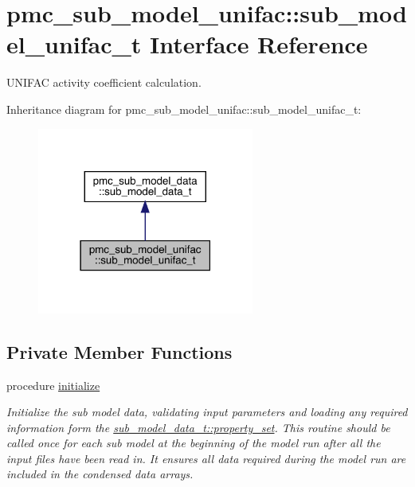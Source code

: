 \hypertarget{structpmc__sub__model__unifac_1_1sub__model__unifac__t}{}\section{pmc\+\_\+sub\+\_\+model\+\_\+unifac\+:\+:sub\+\_\+model\+\_\+unifac\+\_\+t Interface Reference}
\label{structpmc__sub__model__unifac_1_1sub__model__unifac__t}


U\+N\+I\+F\+AC activity coefficient calculation.  




Inheritance diagram for pmc\+\_\+sub\+\_\+model\+\_\+unifac\+:\+:sub\+\_\+model\+\_\+unifac\+\_\+t\+:\nopagebreak
\begin{figure}[H]
\begin{center}
\leavevmode
\includegraphics[width=202pt]{structpmc__sub__model__unifac_1_1sub__model__unifac__t__inherit__graph}
\end{center}
\end{figure}
\subsection*{Private Member Functions}
\begin{DoxyCompactItemize}
\item 
procedure \mbox{\hyperlink{structpmc__sub__model__unifac_1_1sub__model__unifac__t_a83e935943631e93b122ff15fd4b8dcd8}{initialize}}
\begin{DoxyCompactList}\small\item\em Initialize the sub model data, validating input parameters and loading any required information form the {\ttfamily \mbox{\hyperlink{structpmc__sub__model__data_1_1sub__model__data__t_aeb00155797966fc95e75ad14d45e7242}{sub\+\_\+model\+\_\+data\+\_\+t\+::property\+\_\+set}}}. This routine should be called once for each sub model at the beginning of the model run after all the input files have been read in. It ensures all data required during the model run are included in the condensed data arrays. \end{DoxyCompactList}\end{DoxyCompactItemize}
